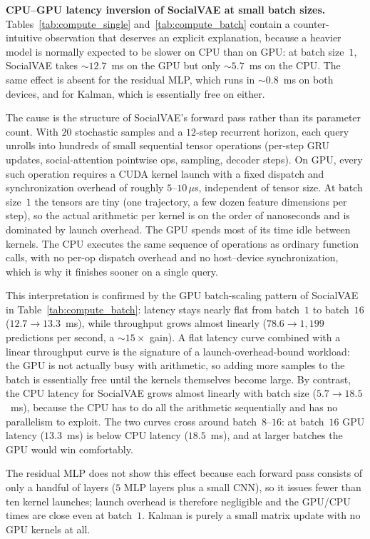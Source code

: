 \documentclass[12pt, a4paper]{article}
\begin{document}
\textbf{CPU--GPU latency inversion of SocialVAE at small batch sizes.} Tables~\ref{tab:compute_single} and~\ref{tab:compute_batch} contain a counter-intuitive observation that deserves an explicit explanation, because a heavier model is normally expected to be slower on CPU than on GPU: at batch size~$1$, SocialVAE takes $\sim 12.7$~ms on the GPU but only $\sim 5.7$~ms on the CPU. The same effect is absent for the residual MLP, which runs in $\sim 0.8$~ms on both devices, and for Kalman, which is essentially free on either.

The cause is the structure of SocialVAE's forward pass rather than its parameter count. With $20$ stochastic samples and a $12$-step recurrent horizon, each query unrolls into hundreds of small sequential tensor operations (per-step GRU updates, social-attention pointwise ops, sampling, decoder steps). On GPU, every such operation requires a CUDA kernel launch with a fixed dispatch and synchronization overhead of roughly $5$--$10\,\mu$s, independent of tensor size. At batch size~$1$ the tensors are tiny (one trajectory, a few dozen feature dimensions per step), so the actual arithmetic per kernel is on the order of nanoseconds and is dominated by launch overhead. The GPU spends most of its time idle between kernels. The CPU executes the same sequence of operations as ordinary function calls, with no per-op dispatch overhead and no host--device synchronization, which is why it finishes sooner on a single query.

This interpretation is confirmed by the GPU batch-scaling pattern of SocialVAE in Table~\ref{tab:compute_batch}: latency stays nearly flat from batch~$1$ to batch~$16$ ($12.7\to 13.3$~ms), while throughput grows almost linearly ($78.6\to 1{,}199$ predictions per second, a $\sim 15\times$ gain). A flat latency curve combined with a linear throughput curve is the signature of a launch-overhead-bound workload: the GPU is not actually busy with arithmetic, so adding more samples to the batch is essentially free until the kernels themselves become large. By contrast, the CPU latency for SocialVAE grows almost linearly with batch size ($5.7\to 18.5$~ms), because the CPU has to do all the arithmetic sequentially and has no parallelism to exploit. The two curves cross around batch~$8$--$16$: at batch~$16$ GPU latency ($13.3$~ms) is below CPU latency ($18.5$~ms), and at larger batches the GPU would win comfortably.

The residual MLP does not show this effect because each forward pass consists of only a handful of layers ($5$ MLP layers plus a small CNN), so it issues fewer than ten kernel launches; launch overhead is therefore negligible and the GPU/CPU times are close even at batch~$1$. Kalman is purely a small matrix update with no GPU kernels at all.
\end{document}

